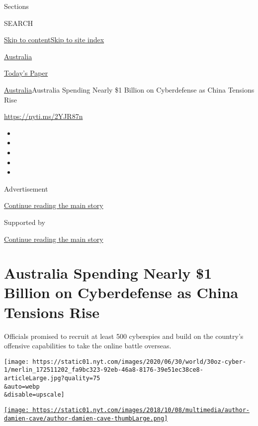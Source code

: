 Sections

SEARCH

\protect\hyperlink{site-content}{Skip to
content}\protect\hyperlink{site-index}{Skip to site index}

\href{https://www.nytimes.com/section/world/australia}{Australia}

\href{https://myaccount.nytimes.com/auth/login?response_type=cookie\&client_id=vi}{}

\href{https://www.nytimes.com/section/todayspaper}{Today's Paper}

\href{/section/world/australia}{Australia}\textbar{}Australia Spending
Nearly \$1 Billion on Cyberdefense as China Tensions Rise

\url{https://nyti.ms/2YJR87n}

\begin{itemize}
\item
\item
\item
\item
\item
\end{itemize}

Advertisement

\protect\hyperlink{after-top}{Continue reading the main story}

Supported by

\protect\hyperlink{after-sponsor}{Continue reading the main story}

\hypertarget{australia-spending-nearly-1-billion-on-cyberdefense-as-china-tensions-rise}{%
\section{Australia Spending Nearly \$1 Billion on Cyberdefense as China
Tensions
Rise}\label{australia-spending-nearly-1-billion-on-cyberdefense-as-china-tensions-rise}}

Officials promised to recruit at least 500 cyberspies and build on the
country's offensive capabilities to take the online battle overseas.

\texttt{[image: https://static01.nyt.com/images/2020/06/30/world/30oz-cyber-1/merlin\_172511202\_fa9bc323-92eb-46a8-8176-39e51ec38ce8-articleLarge.jpg?quality=75\\\&auto=webp\\\&disable=upscale]}

\href{https://www.nytimes.com/by/damien-cave}{\texttt{[image: https://static01.nyt.com/images/2018/10/08/multimedia/author-damien-cave/author-damien-cave-thumbLarge.png]}}


